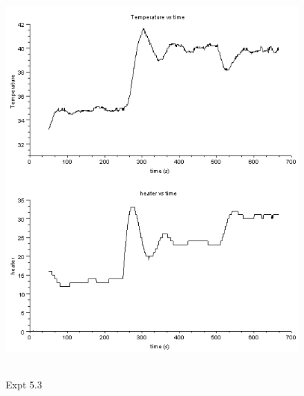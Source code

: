 \begin{figure}[H]
  \includegraphics[width=12cm, height=15cm]{mpc/5_3_heater_final.png}
  \caption{Expt 5.3}
\end{figure}


